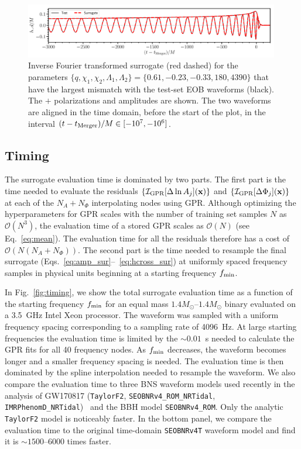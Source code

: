 \documentclass[prd,aps,letter,twocolumn,floatfix,notitlepage,nofootinbib]{revtex4-1}
\def\bx{\mathbf{x}}
\begin{document}
\begin{figure}[htb]
\centering
\includegraphics[width=0.99\textwidth]{hmaxerror.pdf}
\caption{Inverse Fourier transformed surrogate (red dashed) for the parameters $\{q, \chi_1, \chi_2, \Lambda_1, \Lambda_2\} = \{0.61, -0.23, -0.33, 180, 4390\}$ that have the largest mismatch with the test-set EOB waveforms (black). The $+$ polarizations and amplitudes are shown. The two waveforms are aligned in the time domain, before the start of the plot, in the interval $(t-t_{\rm Merger})/M \in [-10^7, -10^6]$.}
\label{fig:maxmismatchtd}
\end{figure}


\subsection{Timing}

The surrogate evaluation time is dominated by two parts. The first part is the time needed to evaluate the residuals $\{\mathcal{I}_{\rm GPR}[\Delta\ln A_j](\bx)\}$ and $\{\mathcal{I}_{\rm GPR}[\Delta\Phi_j](\bx)\}$ at each of the $N_A+N_\Phi$ interpolating nodes using GPR. Although optimizing the hyperparameters for GPR scales with the number of training set samples $N$ as $\mathcal{O}(N^3)$, the evaluation time of a stored GPR scales as $\mathcal{O}(N)$ (see Eq.~\eqref{eq:mean}). The evaluation time for all the residuals therefore has a cost of $\mathcal{O}(N(N_A+N_\Phi))$. The second part is the time needed to resample the final surrogate (Eqs.~\eqref{eq:amp_sur}--~\eqref{eq:hcross_sur}) at uniformly spaced frequency samples in physical units beginning at a starting frequency $f_{\rm min}$. 

In Fig.~\ref{fig:timing}, we show the total surrogate evaluation time as a function of the starting frequency $f_{\rm min}$ for an equal mass $1.4M_\odot$--$1.4M_\odot$ binary evaluated on a 3.5~GHz Intel Xeon processor. The waveform was sampled with a uniform frequency spacing corresponding to a sampling rate of 4096~Hz. At large starting frequencies the evaluation time is limited by the $\sim 0.01$~s needed to calculate the GPR fits for all 40 frequency nodes. As $f_{\rm min}$ decreases, the waveform becomes longer and a smaller frequency spacing is needed. The evaluation time is then dominated by the spline interpolation needed to resample the waveform. We also compare the evaluation time to three BNS waveform models used recently in the analysis of GW170817 (\texttt{TaylorF2}, \texttt{SEOBNRv4\_ROM\_NRTidal}, \texttt{IMRPhenomD\_NRTidal})~\cite{BNSPE} and the BBH model \texttt{SEOBNRv4\_ROM}. Only the analytic \texttt{TaylorF2} model is noticeably faster. In the bottom panel, we compare the evaluation time to the original time-domain \texttt{SEOBNRv4T} waveform model and find it is $\sim 1500$--6000 times faster.
\end{document}
